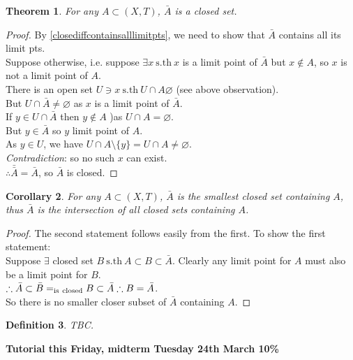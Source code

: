 \documentclass{article}
\newcommand{\sth}{\mathrm{s.th}\ }
\renewcommand{\emptyset}{\varnothing}
\newtheorem{stheorem}{Theorem}[theorem]
\newtheorem{sdefinition}[stheorem]{Definition}
\newtheorem{scorollary}[stheorem]{Corollary}
\theoremstyle{remark}
\theoremstyle{example}
\theoremstyle{examples}
\begin{document}
	\begin{stheorem}
		For any $A \subset (X,T)$, $\bar{A}$ is a closed set.
	\end{stheorem}
	\begin{proof}
		By \ref{closediffcontainsalllimitpts}, we need to show that $\bar{A}$ contains all its limit pts.\\
		Suppose otherwise, i.e. suppose $\exists x\ \sth x$ is a limit point of $\bar{A}$ but $x \notin A$, so $x$ is not a limit point of $A$.\\
		There is an open set $U \ni x\ \sth U \cap A \emptyset$ (see above observation).\\
		But $U \cap \bar{A} \neq \emptyset$ as $x$ is a limit point of $\bar{A}$.\\
		If $y \in U \cap \bar{A}$ then $y \notin A$ )as $U \cap A = \emptyset$.\\
		But $y \in \bar{A}$ so $y$ limit point of $A$.\\
		As $y \in U$, we have $U \cap A \setminus \{y\}=U \cap A \neq \emptyset$.\\
		\textit{Contradiction}: so no such $x$ can exist.\\
		$\therefore \bar{\bar{A}} = \bar{A}$, so $\bar{A}$ is closed.
	\end{proof}

	\begin{scorollary}
		\label{abarissmallestclosedset}
		For any $A \subset(X,T)$, $\bar{A}$ is the smallest closed set containing $A$, thus $\bar{A}$ is the intersection of all closed sets containing $A$.
	\end{scorollary}

	\begin{proof}
		The second statement follows easily from the first. To show the first statement:\\
		Suppose $\exists$ closed set $B\ \sth A \subset B \subset \bar{A}$. Clearly any limit point for $A$ must also be a limit point for $B$.\\
		$\therefore \bar{A} \subset \bar{B} =_\mathrm{is\ closed} B \subset \bar{A}\\
		\therefore B = \bar{A}$.\\
		So there is no smaller closer subset of $\bar{A}$ containing $A$.
	\end{proof}
	\begin{sdefinition}
		TBC.
	\end{sdefinition}
	
	
	\textbf{Tutorial this Friday, midterm Tuesday 24th March 10\%}
	
\end{document}
